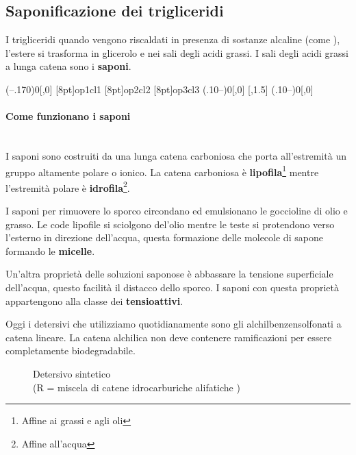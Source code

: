 \subsection{Saponificazione dei trigliceridi}
I trigliceridi quando vengono riscaldati in presenza di sostanze alcaline (come ), l'estere si trasforma in glicerolo e nei sali degli acidi grassi. I sali degli acidi grassi a lunga catena sono i \textbf{saponi}.
\chemnameinit{}
{\small
\begin{reaction}
	\arrow(--.170){0}[,0]
	\makepolymerdelims[delimiters=(),subscript=$\scriptstyle \!8$]{2pt}[8pt]{op1}{cl1}
	\makepolymerdelims[delimiters=(),subscript=$\scriptstyle \!8$]{2pt}[8pt]{op2}{cl2}
	\makepolymerdelims[delimiters=(),subscript=$\scriptstyle \!8$]{2pt}[8pt]{op3}{cl3}
	\arrow(.10--){0}[,0]\+ 
	[,1.5]
	 \arrow(.10--){0}[,0] 
\end{reaction}}

\paragraph{Come funzionano i saponi}\mbox{}\\
I saponi sono costruiti da una lunga catena carboniosa che porta all'estremità un gruppo altamente polare o ionico. La catena carboniosa è \textbf{lipofila}\footnote{Affine ai grassi e agli oli} mentre l'estremità polare è \textbf{idrofila}\footnote{Affine all'acqua}.

I saponi per rimuovere lo sporco circondano ed emulsionano le goccioline di olio e grasso. Le code lipofile si sciolgono del'olio mentre le teste si protendono verso l'esterno in direzione dell'acqua, questa formazione delle molecole di sapone formando le \textbf{micelle}.

Un'altra proprietà delle soluzioni saponose è abbassare la tensione superficiale dell'acqua, questo facilità il distacco dello sporco. I saponi con questa proprietà appartengono alla classe dei \textbf{tensioattivi}.

Oggi i detersivi che utilizziamo quotidianamente sono gli alchilbenzensolfonati a catena lineare. La catena alchilica non deve contenere ramificazioni per essere completamente biodegradabile.

\begin{figure}[H]
	\centering
	\caption[Detersivo sintetico]{Detersivo sintetico\\(R = miscela di catene idrocarburiche alifatiche )}
\end{figure}